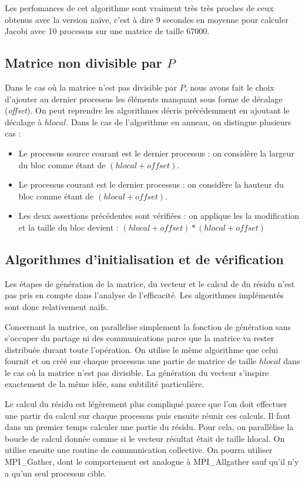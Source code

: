 \documentclass[a4paper]{article}
\begin{document}
Les perfomances de cet algorithme sont vraiment très très proches de
ceux obtenus avec la version naïve, c'est à dire 9 secondes
en moyenne pour calculer Jacobi avec 10 processus sur une matrice de taille
67000.



\subsection{Matrice non divisible par $P$}

Dans le cas où la matrice n'est pas divisible par $P$, nous avons fait
le choix d'ajouter au dernier processus les éléments manquant sous
forme de décalage (\emph{offset}). On peut reprendre les algorithmes
décris précédemment en ajoutant le décalage à $hlocal$. Dans le cas de
l'algorithme en anneau, on distingue plusieurs cas :
\begin{itemize}
\item Le processus source courant est le dernier processus : on
considère la largeur du bloc comme étant de $(hlocal + offset)$.
\item Le processus courant est le dernier processus : on considère la
hauteur du bloc comme étant de $(hlocal + offset)$.
\item Les deux assertions précédentes sont vérifiées : on applique les
la modification et la taille du bloc devient : $(hlocal + offset) *
(hlocal + offset)$
\end{itemize}

\subsection{Algorithmes d'initialisation et de vérification}

Les étapes de génération de la matrice, du vecteur et le calcul de du
résidu n'est pas pris en compte dans l'analyse de l'efficacité. Les
algorithmes implémentés sont donc relativement naïfs.

Concernant la matrice, on parallelise simplement la fonction de
génération sans s'occuper du partage ni des communications parce que
la matrice va rester distribuée durant toute l'opération. On utilise
le même algorithme que celui fournit et on créé sur chaque processus
une partie de matrice de taille $hlocal$ dans le cas où la
matrice n'est pas divisible. La génération du vecteur s'inspire
exactement de la même idée, sans subtilité particulière.

Le calcul du résidu est légèrement plus compliqué parce que l'on doit
effectuer une partir du calcul sur chaque processus puis ensuite
réunir ces calculs. Il faut dans un premier temps calculer une partie
du résidu. Pour cela, on parallèlise la boucle de calcul donnée comme
si le vecteur résultat était de taille hlocal. On utilise ensuite une
routine de communication collective. On pourra utiliser MPI\_Gather,
dont le comportement est analogue à MPI\_Allgather sauf qu'il n'y a
qu'un seul processus cible.
\end{document}
